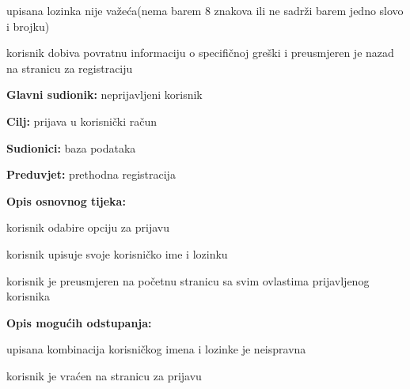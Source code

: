 \begin{packed_item}
\begin{packed_item}
\begin{packed_enum}
								
							\end{packed_enum}
							\item[2.b] upisana lozinka nije važeća(nema barem 8 znakova ili ne sadrži barem jedno slovo i brojku)
							\begin{packed_enum}
								
								\item korisnik dobiva povratnu informaciju o specifičnoj greški i preusmjeren je nazad na stranicu za              registraciju
								
								
							\end{packed_enum}
							
						\end{packed_item}
					\end{packed_item}
					
					\noindent {}
					\begin{packed_item}
						
						\item \textbf{Glavni sudionik: }neprijavljeni korisnik
						\item  \textbf{Cilj:} prijava u korisnički račun
						\item  \textbf{Sudionici:} baza podataka
						\item  \textbf{Preduvjet:} prethodna registracija
						\item  \textbf{Opis osnovnog tijeka:}
						
						\item[] \begin{packed_enum}
							
							\item korisnik odabire opciju za prijavu
							\item korisnik upisuje svoje korisničko ime i lozinku
							\item korisnik je preusmjeren na početnu stranicu sa svim ovlastima prijavljenog korisnika
						
						\end{packed_enum}
						
						\item  \textbf{Opis mogućih odstupanja:}
						
						\item[] \begin{packed_item}
							
							\item[2.a] upisana kombinacija korisničkog imena i lozinke je neispravna
							\item[] \begin{packed_enum}
								
								\item korisnik je vraćen na stranicu za prijavu
								
							\end{packed_enum}
						
							
						\end{packed_item}
					\end{packed_item}
					
